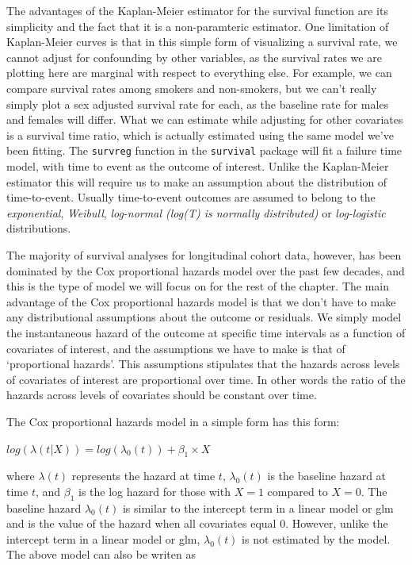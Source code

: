 \documentclass[
]{book}
\begin{document}
The advantages of the Kaplan-Meier estimator for the survival function are its simplicity and the fact that it is a non-paramteric estimator. One limitation of Kaplan-Meier curves is that in this simple form of visualizing a survival rate, we cannot adjust for confounding by other variables, as the survival rates we are plotting here are marginal with respect to everything else. For example, we can compare survival rates among smokers and non-smokers, but we can't really simply plot a sex adjusted survival rate for each, as the baseline rate for males and females will differ. What we can estimate while adjusting for other covariates is a survival time ratio, which is actually estimated using the same model we've been fitting. The \texttt{survreg} function in the \texttt{survival} package will fit a failure time model, with time to event as the outcome of interest. Unlike the Kaplan-Meier estimator this will require us to make an assumption about the distribution of time-to-event. Usually time-to-event outcomes are assumed to belong to the \emph{exponential}, \emph{Weibull}, \emph{log-normal (log(T) is normally distributed)} or \emph{log-logistic} distributions.

The majority of survival analyses for longitudinal cohort data, however, has been dominated by the Cox proportional hazards model over the past few decades, and this is the type of model we will focus on for the rest of the chapter. The main advantage of the Cox proportional hazards model is that we don't have to make any distributional assumptions about the outcome or residuals. We simply model the instantaneous hazard of the outcome at specific time intervals as a function of covariates of interest, and the assumptions we have to make is that of `proportional hazards'. This assumptions stipulates that the hazards across levels of covariates of interest are proportional over time. In other words the ratio of the hazards across levels of covariates should be constant over time.

The Cox proportional hazards model in a simple form has this form:

\(log(\lambda(t|X))=log(\lambda_{0}(t))+\beta_{1}\times X\)

where \(\lambda(t)\) represents the hazard at time \(t\), \(\lambda_{0}(t)\) is the baseline hazard at time \(t\), and \(\beta_{1}\) is the log hazard for those with \(X=1\) compared to \(X=0\). The baseline hazard \(\lambda_{0}(t)\) is similar to the intercept term in a linear model or glm and is the value of the hazard when all covariates equal 0. However, unlike the intercept term in a linear model or glm, \(\lambda_{0}(t)\) is not estimated by the model.
The above model can also be writen as
\end{document}
